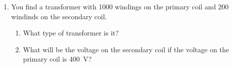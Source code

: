 {{\begin{eocexercises}{}
\begin {enumerate}
\item You find a transformer with 1000 windings on the primary coil and 200 windinds on the secondary coil.
\begin{enumerate}
\item What type of transformer is it?
\item What will be the voltage on the secondary coil if the voltage on the primary coil is 400~V?

\end{enumerate}



\end{enumerate}
\end{eocexercises}}}
